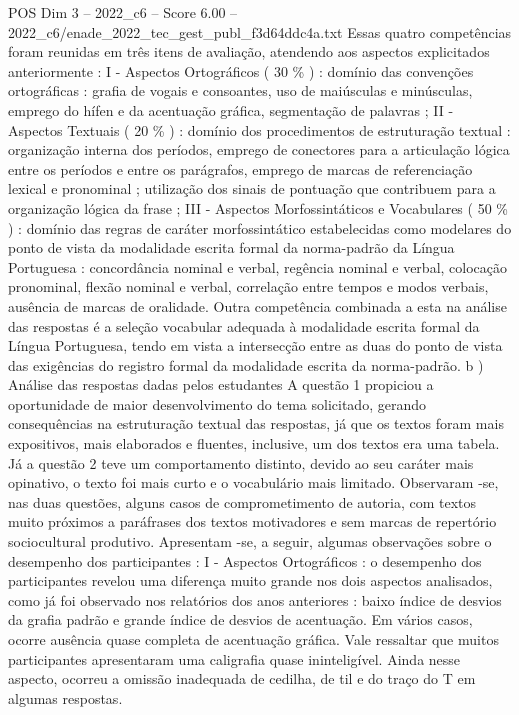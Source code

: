 \begin{textsample}{POS Dim 3 – 2022\_c6 – Score 6.00 – 2022\_c6/enade\_2022\_tec\_gest\_publ\_f3d64ddc4a.txt}
Essas quatro competências foram reunidas em três itens de avaliação, atendendo aos aspectos explicitados anteriormente : I - Aspectos Ortográficos ( 30 \% ) : domínio das convenções ortográficas : grafia de vogais e consoantes, uso de maiúsculas e minúsculas, emprego do hífen e da acentuação gráfica, segmentação de palavras ; II - Aspectos Textuais ( 20 \% ) : domínio dos procedimentos de estruturação textual : organização interna dos períodos, emprego de conectores para a articulação lógica entre os períodos e entre os parágrafos, emprego de marcas de referenciação lexical e pronominal ; utilização dos sinais de pontuação que contribuem para a organização lógica da frase ; III - Aspectos Morfossintáticos e Vocabulares ( 50 \% ) : domínio das regras de caráter morfossintático estabelecidas como modelares do ponto de vista da modalidade escrita formal da norma-padrão da Língua Portuguesa : concordância nominal e verbal, regência nominal e verbal, colocação pronominal, flexão nominal e verbal, correlação entre tempos e modos verbais, ausência de marcas de oralidade.
Outra competência combinada a esta na análise das respostas é a seleção vocabular adequada à modalidade escrita formal da Língua Portuguesa, tendo em vista a intersecção entre as duas do ponto de vista das exigências do registro formal da modalidade escrita da norma-padrão. b ) Análise das respostas dadas pelos estudantes A questão 1 propiciou a oportunidade de maior desenvolvimento do tema solicitado, gerando consequências na estruturação textual das respostas, já que os textos foram mais expositivos, mais elaborados e fluentes, inclusive, um dos textos era uma tabela.
Já a questão 2 teve um comportamento distinto, devido ao seu caráter mais opinativo, o texto foi mais curto e o vocabulário mais limitado.
Observaram -se, nas duas questões, alguns casos de comprometimento de autoria, com textos muito próximos a paráfrases dos textos motivadores e sem marcas de repertório sociocultural produtivo.
Apresentam -se, a seguir, algumas observações sobre o desempenho dos participantes : I - Aspectos Ortográficos : o desempenho dos participantes revelou uma diferença muito grande nos dois aspectos analisados, como já foi observado nos relatórios dos anos anteriores : baixo índice de desvios da grafia padrão e grande índice de desvios de acentuação.
Em vários casos, ocorre ausência quase completa de acentuação gráfica.
Vale ressaltar que muitos participantes apresentaram uma caligrafia quase ininteligível.
Ainda nesse aspecto, ocorreu a omissão inadequada de cedilha, de til e do traço do T em algumas respostas.

\end{textsample}
